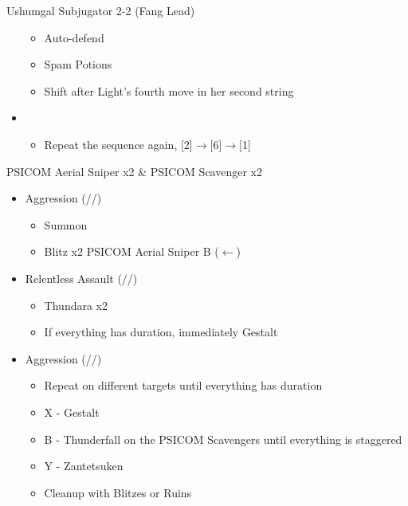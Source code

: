 \begin{multicols}{2}
\begin{battle}{Ushumgal Subjugator 2-2 (Fang Lead)}
\begin{itemize}
    \begin{itemize}
        \item Auto-defend
        \item Spam Potions
        \item Shift after Light's fourth move in her second string
    \end{itemize}
    \item \second
    \begin{itemize}
        \item Repeat the sequence again, [2]$\rightarrow$[6]$\rightarrow$[1]
    \end{itemize}
\end{itemize}
\end{battle}
\end{multicols}
\newpage
\begin{multicols}{2}
\renewcommand{\first}{[1] Aggression (\com/\com/\rav)}
\renewcommand{\second}{[2] Relentless Assault (\rav/\com/\rav)}
\begin{battle}{PSICOM Aerial Sniper x2 \& PSICOM Scavenger x2}
\begin{itemize}
    \item \first
    \begin{itemize}
        \item Summon
        \item Blitz x2 PSICOM Aerial Sniper B ($\leftarrow$)
    \end{itemize}
    \item \second
    \begin{itemize}
        \item Thundara x2
        \item If everything has duration, immediately Gestalt
    \end{itemize}
    \item \first
    \begin{itemize}
        \item Repeat on different targets until everything has duration
        \item X - Gestalt
        \item B - Thunderfall on the PSICOM Scavengers until everything is staggered
        \item Y - Zantetsuken
        \item Cleanup with Blitzes or Ruins
    \end{itemize}
\end{itemize}

\end{battle}
\end{multicols}
